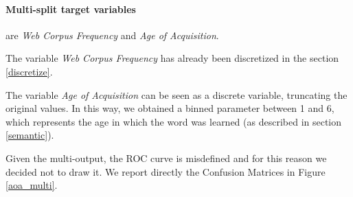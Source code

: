 \documentclass[a4paper,11pt,dvipsnames]{article}
\begin{document}
\paragraph{Multi-split target variables} are \textit{Web Corpus Frequency} and \textit{Age of Acquisition}. 

The variable \textit{Web Corpus Frequency} has already been discretized in the section \ref{discretize}.

The variable \textit{Age of Acquisition} can be seen as a discrete variable, truncating the original values. In this way, we obtained a binned parameter between 1 and 6, which represents the age in which the word was learned (as described in section \ref{semantic}).

Given the multi-output, the ROC curve is misdefined and for this reason we decided not to draw it. We report directly the Confusion Matrices in Figure \ref{aoa_multi}.
\end{document}
